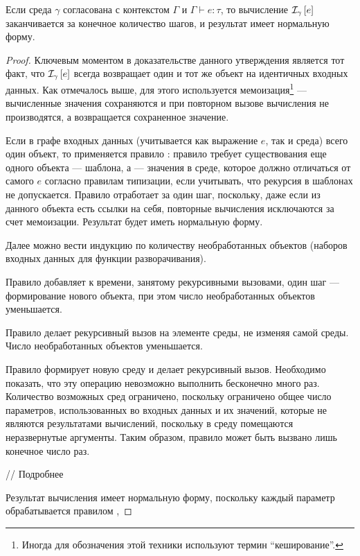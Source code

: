 \begin{Th}[О нормализации]
Если среда $\gamma$ согласована с контекстом $\Gamma$ и $\Gamma \vdash e : \tau$, то вычисление $\mathcal{I}_{\gamma} \left[ e \right]$ заканчивается за конечное количество шагов, и результат имеет нормальную форму.
\end{Th}
\begin{proof}
Ключевым моментом в доказательстве данного утверждения является тот факт, что $\mathcal{I}_{\gamma} \left[ e \right]$ всегда возвращает один и тот же объект на идентичных входных данных. Как отмечалось выше, для этого используется мемоизация\footnote{Иногда для обозначения этой техники используют термин ``кеширование''.} --- вычисленные значения сохраняются и при повторном вызове вычисления не производятся, а возвращается сохраненное значение.

Если в графе входных данных (учитывается как выражение $e$, так и среда) всего один объект, то применяется правило : правило  требует существования еще одного объекта --- шаблона, а  --- значения в среде, которое должно отличаться от самого $e$ согласно правилам типизации, если учитывать, что рекурсия в шаблонах не допускается. Правило  отработает за один шаг, поскольку, даже если из данного объекта есть ссылки на себя, повторные вычисления исключаются за счет мемоизации. Результат будет иметь нормальную форму.

Далее можно вести индукцию по количеству необработанных объектов (наборов входных данных для функции разворачивания). 

Правило  добавляет к времени, занятому рекурсивными вызовами, один шаг --- формирование нового объекта, при этом число необработанных объектов уменьшается.

Правило  делает рекурсивный вызов на элементе среды, не изменяя самой среды. Число необработанных объектов уменьшается.

Правило  формирует новую среду и делает рекурсивный вызов. Необходимо показать, что эту операцию невозможно выполнить бесконечно много раз. Количество возможных сред ограничено, поскольку ограничено общее число параметров, использованных во входных данных и их значений, которые не являются результатами вычислений, поскольку в среду помещаются неразвернутые аргументы.
Таким образом, правило  может быть вызвано лишь конечное число раз.

// Подробнее

Результат вычисления имеет нормальную форму, поскольку каждый параметр обрабатывается правилом ,
\end{proof}

